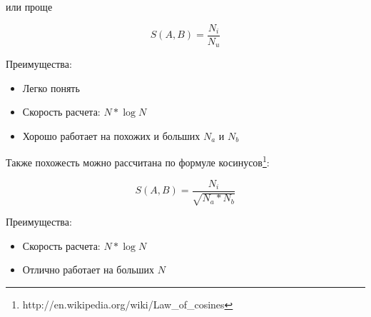 или проще

\begin{equation}
 \label{eq:smlar2}
 S(A,B) = \frac{N_{i}}{N_{u}}
\end{equation}

Преимущества:

\begin{itemize}
\item Легко понять
\item Скорость расчета: $N * \log{N}$
\item Хорошо работает на похожих и больших $N_a$ и $N_b$
\end{itemize}

Также похожесть можно рассчитана по формуле косинусов\footnote{http://en.wikipedia.org/wiki/Law\_of\_cosines}:

\begin{equation}
 \label{eq:smlar3}
 S(A,B) = \frac{N_{i}}{\sqrt{N_{a}*N_{b}}}
\end{equation}

Преимущества:

\begin{itemize}
\item Скорость расчета: $N * \log{N}$
\item Отлично работает на больших $N$
\end{itemize}